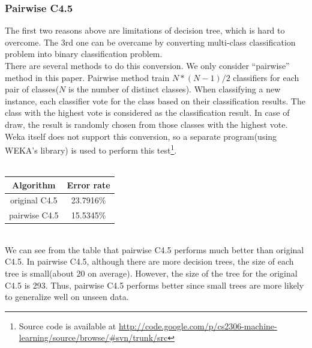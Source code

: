 \documentclass[a4paper,11pt]{article}
\begin{document}
\subsubsection{Pairwise C4.5}
The first two reasons above are limitations of decision tree, which is hard to overcome. The 3rd one can be overcame by converting multi-class classification problem into binary classification problem.\\
There are several methods to do this conversion. We only consider ``pairwise'' method in this paper. Pairwise method train $N*(N-1)/2$ classifiers for each pair of classes($N$ is the number of distinct classes). When classifying a new instance, each classifier vote for the class based on their classification results. The class with the highest vote is considered as the classification result. In case of draw, the result is randomly chosen from those classes with the highest vote.\\
Weka itself does not support this conversion, so a separate program(using WEKA's library) is used to perform this test\footnote{Source code is available at \url{http://code.google.com/p/cs2306-machine-learning/source/browse/#svn/trunk/src}}.\\
\vspace{0.5cm}\\
\begin{tabular}{c c}
Algorithm	& Error rate\\
\hline \hline
original C4.5	& 23.7916\%\\
pairwise C4.5	& 15.5345\%\\
\end{tabular}
\vspace{0.5cm}\\
We can see from the table that pairwise C4.5 performs much better than original C4.5. In pairwise C4.5, although there are more decision trees, the size of each tree is small(about 20 on average). However, the size of the tree for the original C4.5 is 293. Thus, pairwise C4.5 performs better since small trees are more likely to generalize well on unseen data.
\end{document}
